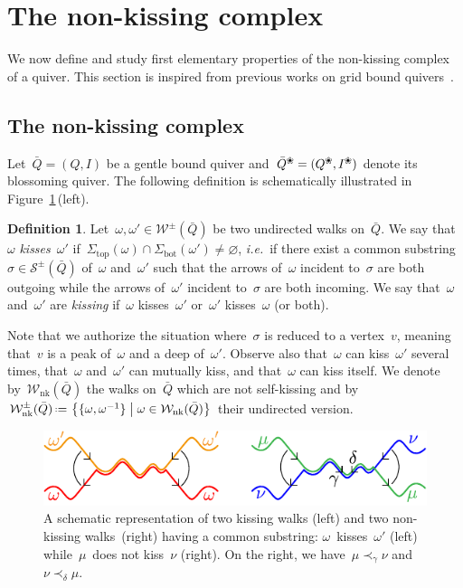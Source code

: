 \documentclass{amsart}
\theoremstyle{definition}
\newtheorem{definition}[theorem]{Definition}
\newcommand{\set}[2]{\left\{ #1 \;\middle|\; #2 \right\}} %
\newcommand{\eqdef}{\mbox{\,\raisebox{0.2ex}{\scriptsize\ensuremath{\mathrm:}}\ensuremath{=}\,}} %
\newcommand{\fref}[1]{Figure~\ref{#1}} %
\newcommand{\ie}{\textit{i.e.}~} %
\newcommand{\darkblue}{\color{darkblue}} %
\newcommand{\defn}[1]{\textsl{\darkblue #1}} %
\newcommand{\blossom}{^\text{\ding{96}}} %
\newcommand{\strings}{\mathcal{S}} %
\newcommand{\walks}{\mathcal{W}} %
\newcommand{\NKWalks}{\mathcal{W}_\mathrm{nk}} %
\renewcommand{\top}{\mathrm{top}} %
\newcommand{\bottom}{\mathrm{bot}} %
\begin{document}

\section{The non-kissing complex}
\label{sec:nonKissingComplex}

We now define and study first elementary properties of the non-kissing complex of a quiver.
This section is inspired from previous works on grid bound quivers~\cite{PetersenPylyavskyySpeyer, SantosStumpWelker, McConville, GarverMcConville}.

\subsection{The non-kissing complex}

Let~$\bar Q = (Q,I)$ be a gentle bound quiver and~$\bar Q\blossom = (Q\blossom,I\blossom)$ denote its blossoming quiver.
The following definition is schematically illustrated in \fref{fig:kissingCrossing}\,(left).

\begin{definition}\label{def: kissing}
Let~$\omega,\omega' \in \walks^\pm(\bar Q)$ be two undirected walks on~$\bar Q$.
We say that~$\omega$ \defn{kisses}~$\omega'$ if~$\Sigma_\top(\omega) \cap \Sigma_\bottom(\omega') \ne \varnothing$, \ie if there exist a common substring~$\sigma \in \strings^\pm(\bar Q)$ of~$\omega$ and~$\omega'$ such that the arrows of~$\omega$ incident to~$\sigma$ are both outgoing while the arrows of~$\omega'$ incident to~$\sigma$ are both incoming.
We say that~$\omega$ and~$\omega'$ are \defn{kissing} if~$\omega$ kisses~$\omega'$ or~$\omega'$ kisses~$\omega$ (or both).
\end{definition}

Note that we authorize the situation where~$\sigma$ is reduced to a vertex~$v$, meaning that~$v$ is a peak of~$\omega$ and a deep of~$\omega'$.
Observe also that~$\omega$ can kiss~$\omega'$ several times, that~$\omega$ and~$\omega'$ can mutually kiss, and that~$\omega$ can kiss itself.
We denote by~$\NKWalks(\bar Q)$ the walks on~$\bar Q$ which are not self-kissing and by~$\NKWalks^\pm(\bar Q) \eqdef \set{\{\omega, \omega^{-1}\}}{\omega \in \NKWalks(\bar Q)}$ their undirected version.

\begin{figure}[b]
	\capstart
	\centerline{\includegraphics[scale=1]{kissingCrossing}}
	\caption{A schematic representation of two kissing walks (left) and two non-kissing walks~(right) having a common substring: $\omega$~kisses~$\omega'$ (left) while~$\mu$~does not kiss~$\nu$ (right). On the right, we have~$\mu \prec_\gamma \nu$ and~$\nu \prec_\delta \mu$.}
	\label{fig:kissingCrossing}
\end{figure}
\end{document}
